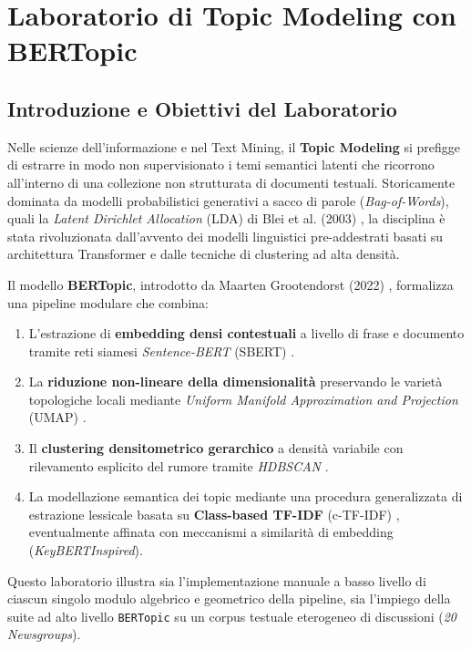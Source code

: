 \FloatBarrier
\section{Laboratorio di Topic Modeling con BERTopic}
\label{chap:lab-topic-modeling-bertopic}

\FloatBarrier
\subsection{Introduzione e Obiettivi del Laboratorio}
\label{sec:lab-bertopic-intro}

Nelle scienze dell'informazione e nel Text Mining, il \textbf{Topic Modeling} si prefigge di estrarre in modo non supervisionato i temi semantici latenti che ricorrono all'interno di una collezione non strutturata di documenti testuali. Storicamente dominata da modelli probabilistici generativi a sacco di parole (\textit{Bag-of-Words}), quali la \textit{Latent Dirichlet Allocation} (LDA) di Blei et al. (2003) \cite{blei2003}, la disciplina è stata rivoluzionata dall'avvento dei modelli linguistici pre-addestrati basati su architettura Transformer e dalle tecniche di clustering ad alta densità.

Il modello \textbf{BERTopic}, introdotto da Maarten Grootendorst (2022) \cite{grootendorst2022}, formalizza una pipeline modulare che combina:
\begin{enumerate}
    \item L'estrazione di \textbf{embedding densi contestuali} a livello di frase e documento tramite reti siamesi \textit{Sentence-BERT} (SBERT) \cite{reimers2019}.
    \item La \textbf{riduzione non-lineare della dimensionalità} preservando le varietà topologiche locali mediante \textit{Uniform Manifold Approximation and Projection} (UMAP) \cite{mcinnes2018}.
    \item Il \textbf{clustering densitometrico gerarchico} a densità variabile con rilevamento esplicito del rumore tramite \textit{HDBSCAN} \cite{campello2015}.
    \item La modellazione semantica dei topic mediante una procedura generalizzata di estrazione lessicale basata su \textbf{Class-based TF-IDF} (c-TF-IDF) \cite{grootendorst2022}, eventualmente affinata con meccanismi a similarità di embedding (\textit{KeyBERTInspired}).
\end{enumerate}

Questo laboratorio illustra sia l'implementazione manuale a basso livello di ciascun singolo modulo algebrico e geometrico della pipeline, sia l'impiego della suite ad alto livello \texttt{BERTopic} su un corpus testuale eterogeneo di discussioni (\textit{20 Newsgroups}).

